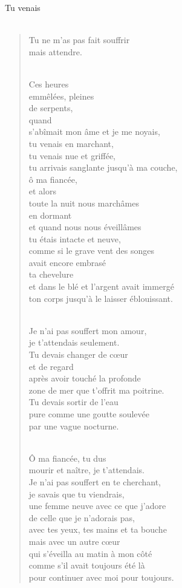 \documentclass[11pt,a4paper]{book}
\begin{document}
\newpage

{\huge Tu venais} \\ \\

\begin{verse}
Tu ne m'as pas fait souffrir \\
mais attendre. \\ \

Ces heures \\
emmêlées, pleines \\
de serpents, \\
quand \\
s'abîmait mon âme et je me noyais, \\
tu venais en marchant, \\
tu venais nue et griffée, \\
tu arrivais sanglante jusqu'à ma couche, \\
ô ma fiancée, \\
et alors \\
toute la nuit nous marchâmes \\
en dormant \\
et quand nous nous éveillâmes \\
tu étais intacte et neuve, \\
comme si le grave vent des songes \\
avait encore embrasé \\
ta chevelure \\
et dans le blé et l'argent avait immergé \\
ton corps jusqu'à le laisser éblouissant. \\ \

Je n'ai pas souffert mon amour, \\
je t'attendais seulement. \\
Tu devais changer de c{\oe}ur \\
et de regard \\
après avoir touché la profonde \\
zone de mer que t'offrit ma poitrine. \\
Tu devais sortir de l'eau \\
pure comme une goutte soulevée \\
par une vague nocturne. \\ \

Ô ma fiancée, tu dus \\
mourir et naître, je t'attendais. \\
Je n'ai pas souffert en te cherchant, \\
je savais que tu viendrais, \\
une femme neuve avec ce que j'adore \\
de celle que je n'adorais pas, \\
avec tes yeux, tes mains et ta bouche \\
mais avec un autre c{\oe}ur \\
qui s'éveilla au matin à mon côté \\
comme s'il avait toujours été là \\
pour continuer avec moi pour toujours.
\end{verse}
\end{document}
